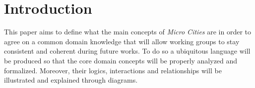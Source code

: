 \section*{Introduction}
\label{sec:introduction}

This paper aims to define what the main concepts of \textit{Micro Cities} are in order to agree on a common domain knowledge that will allow working groups to stay consistent and coherent during future works.
To do so a ubiquitous language will be produced so that the core domain concepts will be properly analyzed and formalized.
Moreover, their logics, interactions and relationships will be illustrated and explained through diagrams.